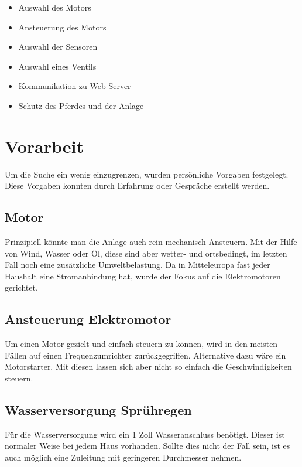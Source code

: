 \begin{itemize}
\item Auswahl des Motors
\item Ansteuerung des Motors
\item Auswahl der Sensoren
\item Auswahl eines Ventils
\item Kommunikation zu Web-Server
\item Schutz des Pferdes und der Anlage
\end{itemize}
\newpage
\section{Vorarbeit}
\label{sec:vorarbeit}

Um die Suche ein wenig einzugrenzen, wurden persönliche Vorgaben festgelegt.
Diese Vorgaben konnten durch Erfahrung oder Gespräche erstellt werden.

\subsection{Motor}
\label{sec:motor}

Prinzipiell könnte man die Anlage auch rein mechanisch Ansteuern. Mit der Hilfe von Wind, Wasser oder Öl, diese sind aber wetter- und ortsbedingt, im letzten Fall noch eine zusätzliche Umweltbelastung. Da in Mitteleuropa fast jeder Haushalt eine Stromanbindung hat, wurde der Fokus auf die Elektromotoren gerichtet.

\subsection{Ansteuerung Elektromotor}
\label{sec:ansteuerungElektromotor}

Um einen Motor gezielt und einfach steuern zu können, wird in den meisten Fällen auf einen Frequenzumrichter zurückgegriffen. Alternative dazu wäre ein Motorstarter. Mit diesen lassen sich aber nicht so einfach die Geschwindigkeiten steuern.

\subsection{Wasserversorgung Sprühregen}
\label{sec:wasserversorgungSpruehregen}

Für die Wasserversorgung wird ein 1 Zoll Wasseranschluss benötigt. Dieser ist normaler Weise bei jedem Haus vorhanden. 
Sollte dies nicht der Fall sein, ist es auch möglich eine Zuleitung mit geringeren Durchmesser nehmen.

